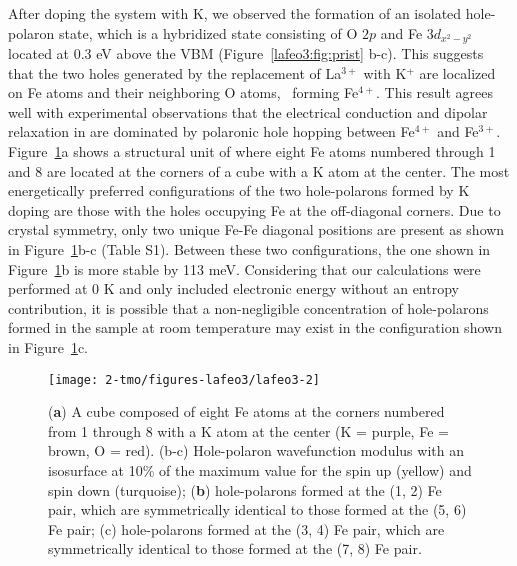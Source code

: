 After doping the system with K, we observed the formation of an isolated hole-polaron state, which is a hybridized state consisting of O $2p$ and Fe $3d_{x^2-y^2}$ located at 0.3 eV above the VBM (Figure~\ref{lafeo3:fig:prist} b-c). This suggests that the two holes generated by the replacement of La$^{3+}$ with K$^+$ are localized on Fe atoms and their neighboring O atoms,~\cite{zhu2017electronic} forming Fe$^{4+}$. This result agrees well with experimental observations that the electrical conduction and dipolar relaxation in  are dominated by polaronic hole hopping between Fe$^{4+}$ and Fe$^{3+}$.~\cite{idrees2011origin,mizusaki1983electronic} Figure~\ref{lafeo3:fig:doped}a shows a structural unit of  where eight Fe atoms numbered through 1 and 8 are located at the corners of a cube with a K atom at the center. The most energetically preferred configurations of the two hole-polarons formed by K doping are those with the holes occupying Fe at the off-diagonal corners. Due to crystal symmetry, only two unique Fe-Fe diagonal positions are present as shown in Figure~\ref{lafeo3:fig:doped}b-c (Table S1). Between these two configurations, the one shown in Figure~\ref{lafeo3:fig:doped}b is more stable by 113 meV. Considering that our calculations were performed at 0 K and only included electronic energy without an entropy contribution, it is possible that a non-negligible concentration of hole-polarons formed in the sample at room temperature may exist in the configuration shown in Figure~\ref{lafeo3:fig:doped}c.


\begin{figure}
    \centering
    \texttt{[image: 2-tmo/figures-lafeo3/lafeo3-2]}
    \caption{
        (\textbf{a}) A cube composed of eight Fe atoms at the corners numbered from 1 through 8 with a K atom at the center (K = purple, Fe = brown, O = red). (b-c) Hole-polaron wavefunction modulus with an isosurface at 10\% of the maximum value for the spin up (yellow) and spin down (turquoise); (\textbf{b}) hole-polarons formed at the (1, 2) Fe pair, which are symmetrically identical to those formed at the (5, 6) Fe pair; (c) hole-polarons formed at the (3, 4) Fe pair, which are symmetrically identical to those formed at the (7, 8) Fe pair.
    }
    \label{lafeo3:fig:doped}
\end{figure}


